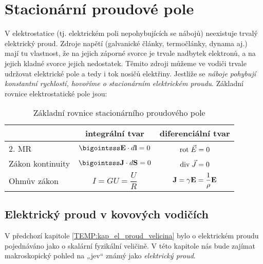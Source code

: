   \section{Stacionární proudové pole}
    V elektrostatice (tj. elektrickém poli nepohybujících se nábojů) neexistuje trvalý elektrický
    proud. Zdroje napětí (galvanické články, termočlánky, dynama aj.) mají tu vlastnost, že na
    jejich záporné svorce je trvale nadbytek elektronů, a na jejich kladné svorce jejich
    nedostatek. Těmito zdroji můžeme ve vodiči trvale udržovat elektrické pole a tedy i tok nosičů
    elektřiny. Jestliže se \emph{náboje pohybují konstantní rychlostí, hovoříme o stacionárním
    elektrickém proudu}. Základní rovnice elektrostatické pole jsou:

    \begin{table}[ht!]
      \setlength\extrarowheight{5pt}
      \centering
      \begin{tabular}{lc|c|}
        \cline{2-3}
        \multicolumn{1}{l|}{} 
          & \textbf{integrální tvar} & \textbf{diferenciální tvar}                    \\[8pt]
        \hline
        \multicolumn{1}{|l|}{2. MR} 
          & \(\bigointsss\vr{E}\cdot d\vr{l} = 0\) & \(\mathrm{rot}\;\vec{E} = 0\)                  \\[8pt] 
        \cline{1-3}
        \hline
        \multicolumn{1}{|l|}{Zákon kontinuity} 
          & \(\bigointsss\vr{J}\cdot d\vr{S}=0\) & \(\mathrm{div}\;\vec{J}=0\)                    \\[8pt]
        \cline{1-3}
        \multicolumn{1}{|l|}{Ohmův zákon}
          & \(I=GU=\dfrac{U}{R}\) & \(\mathbf{J} = \gamma\mathbf{E} = \dfrac{1}{\rho}\mathbf{E}\) \\[8pt]
        \cline{1-3}
      \end{tabular}
      \caption{Základní rovnice stacionárního proudového pole}
    \end{table}
    
    \subsection{Elektrický proud v kovových vodičích}\label{TEMP:kap_elproud_jev}
      V předchozí kapitole \ref{TEMP:kap_el_proud_velicina} bylo o elektrickém proudu pojednáváno
      jako o skalární fyzikální veličině. V této kapitole nás bude zajímat makroskopický pohled na
      „jev“ známý jako \emph{elektrický proud}.
      

